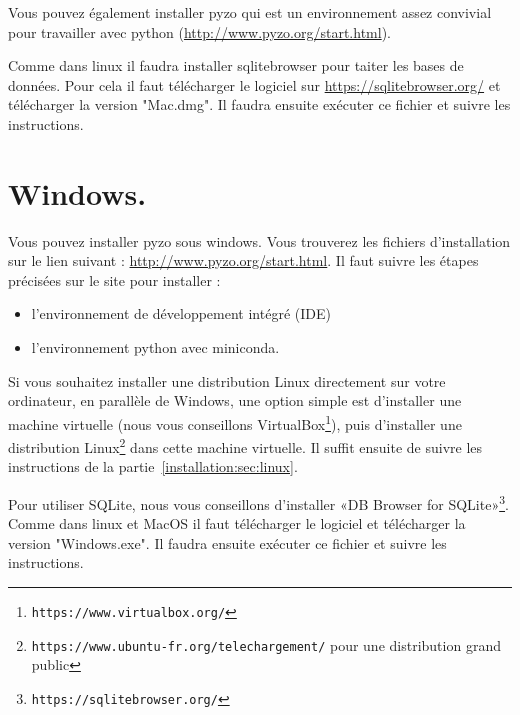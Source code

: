 Vous pouvez également installer pyzo qui est un environnement assez convivial pour travailler avec python (\url{http://www.pyzo.org/start.html}).


Comme dans linux il faudra installer sqlitebrowser pour taiter les bases de données. Pour cela il faut télécharger le logiciel sur \url{https://sqlitebrowser.org/} et télécharger la version "Mac.dmg". Il faudra ensuite exécuter ce fichier et suivre les instructions.



\section{Windows.}

Vous pouvez installer pyzo sous windows. Vous trouverez les fichiers d'installation sur le lien suivant : \url{http://www.pyzo.org/start.html}. Il faut suivre les étapes précisées sur le site pour installer : 
\begin{itemize}
\item l'environnement de développement intégré (IDE)
\item l'environnement python avec miniconda.
\end{itemize}
%
%
Si vous souhaitez installer une distribution Linux directement sur votre ordinateur, en parallèle de Windows, une option simple est d'installer une machine virtuelle (nous vous conseillons {VirtualBox}\footnote{\texttt{https://www.virtualbox.org/}}), puis d'installer une distribution Linux\footnote{\texttt{https://www.ubuntu-fr.org/telechargement/} pour une distribution grand public} dans cette machine virtuelle. 
Il suffit ensuite de suivre les instructions de la partie~\ref{installation:sec:linux}.
%
%

Pour utiliser SQLite, nous vous conseillons d'installer «DB Browser for SQLite»\footnote{\texttt{https://sqlitebrowser.org/}}. Comme dans linux et MacOS il faut télécharger le logiciel et télécharger la version "Windows.exe". Il faudra ensuite exécuter ce fichier et suivre les instructions.